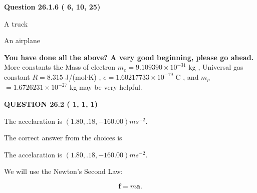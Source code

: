 \documentclass[12pt]{article}
\begin{document}
 
 
  
\vspace{0.2in}
  
{\textbf{\Large{Question
26.1.6 
 (          6,         10,         25)
}}}
  
  
 
 
\noindent{}
 
 
A truck
 
 
An airplane
 
 
 
 
   
   
\vspace{0.3in}
{\textbf{\LARGE{You have done all the above? A very good beginning, please go ahead.}}}
More constants the
Mass of electron
$m_e$$ =
9.109390 \times 10^{-31} $
kg
,
Universal gas constant
$R$$ =
8.315 $
J/(mol$\cdot $K)
,
$e$$ =
1.60217733 \times 10^{-19} $
C
, and
$m_p$$ =
1.6726231 \times 10^{-27} $
kg
%
may be very helpful.
\vspace{0.3in}
   
   
  
\vspace{0.2in}
  
{\textbf{\Large{QUESTION
26.2 
 (          1,          1,          1)
}}}
  
  


 
 
\noindent{}
 
 
The accelaration is $  %
(
1.80,
.18,
-160.00)
ms^{-2} $.
 
 
 
 
 
 
\noindent{}

The correct answer from the choices is


The accelaration is $  %
(
1.80,
.18,
-160.00)
ms^{-2} $.
 
 
 
 
 
\noindent{}

We will use the Newton's Second Law:
 
\[
\mathbf{f}=m\mathbf{a}.
\]
 
\end{document}
